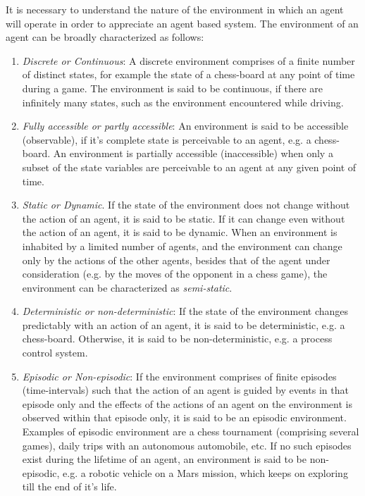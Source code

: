 It is necessary to understand the nature of the environment in which an agent will 
operate in order to appreciate an agent based system. The environment of an agent can be broadly characterized as follows:

\begin{enumerate}
	 
	\item {\em Discrete or Continuous}: A discrete environment comprises of a finite number of distinct states, for example
		the state of a chess-board at any point of time during a game. The environment is said to be continuous, if there
		are infinitely many states, such as the environment encountered while driving.
	   
	\item {\em Fully accessible or partly accessible}: An environment is said to be accessible (observable), if it's complete state is 
		perceivable to an agent, e.g. a chess-board. An environment is partially accessible (inaccessible) when only a subset of the
		state variables are perceivable to an agent at any given point of time.
	 
	\item {\em Static or Dynamic}. If the state of the environment does not change without the action of an agent, it is said
		to be static. If it can change even without the action of an agent, it is said to be dynamic. 
		When an environment is inhabited by a limited number of agents, and the environment can change only by the actions
		of the other agents, besides that of the agent under consideration (e.g. by the moves of the opponent in a chess game), 
		the environment can be characterized as {\it semi-static}.
	 
	\item {\em Deterministic or non-deterministic}: If the state of the environment changes predictably with an action of an agent,
		it is said to be deterministic, e.g. a chess-board. Otherwise, it is said to be non-deterministic, e.g. a process
		control system.
	 
	\item {\em Episodic or Non-episodic}: If the environment comprises of finite episodes (time-intervals) such that the action
		of an agent is guided by events in that episode only and the effects of the actions of an agent on the environment
		is observed within that episode only, it is said to be an episodic environment. Examples of episodic environment 
		are a chess tournament (comprising several games), daily trips with an autonomous automobile, etc. If no such 
		episodes exist during the lifetime of an agent, an environment is said to be non-episodic, e.g. a robotic vehicle 
		on a Mars mission, which keeps on exploring till the end of it's life.
\end{enumerate}

